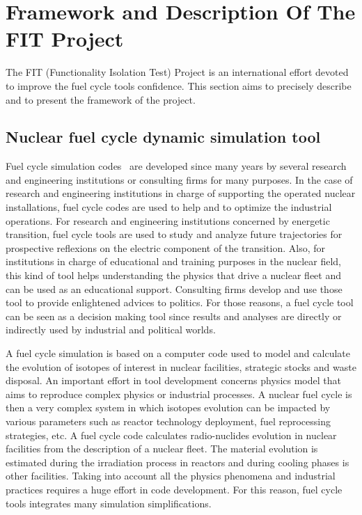 \section{Framework and Description Of The FIT Project}

The FIT (Functionality Isolation Test) Project is an international effort
devoted to improve the fuel cycle tools confidence. This section aims to
precisely describe and to present the framework of the project.

\subsection{Nuclear fuel cycle dynamic simulation tool}

Fuel cycle simulation codes~\cite{NEA2016} are developed since many years by
several research and engineering institutions or consulting firms for many
purposes. In the case of research and engineering institutions in charge of
supporting the operated nuclear installations, fuel cycle codes are used to help
and to optimize the industrial operations. For research and engineering
institutions concerned by energetic transition, fuel cycle tools are used to
study and analyze future trajectories for prospective reflexions on the electric
component of the transition. Also, for institutions in charge of educational and
training purposes in the nuclear field, this kind of tool helps understanding
the physics that drive a nuclear fleet and can be used as an educational
support. Consulting firms develop and use those tool to provide enlightened
advices to politics. For those reasons, a fuel cycle tool can be seen as a
decision making tool since results and analyses are directly or indirectly used
by industrial and political worlds.

A fuel cycle simulation is based on a computer code used to model and calculate
the evolution of isotopes of interest in nuclear facilities, strategic stocks
and waste disposal. An important effort in tool development concerns physics
model that aims to reproduce complex physics or industrial processes. A nuclear
fuel cycle is then a very complex system in which isotopes evolution can be
impacted by various parameters such as reactor technology deployment, fuel
reprocessing strategies, etc. A fuel cycle code calculates radio-nuclides
evolution in nuclear facilities from the description of a nuclear fleet. The
material evolution is estimated during the irradiation process in reactors and
during cooling phases is other facilities. Taking into account all the physics
phenomena and industrial practices requires a huge effort in code development.
For this reason, fuel cycle tools integrates many simulation simplifications.

